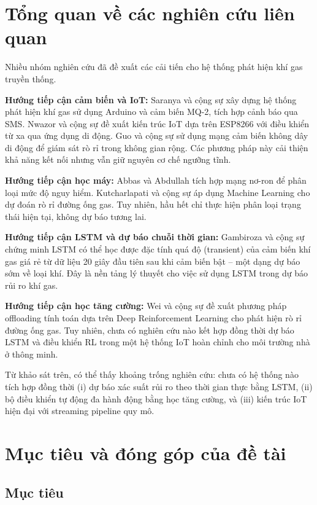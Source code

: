 \section{Tổng quan về các nghiên cứu liên quan}

Nhiều nhóm nghiên cứu đã đề xuất các cải tiến cho hệ thống phát hiện khí gas truyền thống.

\textbf{Hướng tiếp cận cảm biến và IoT:} Saranya và cộng sự \cite{saranya2023} xây dựng hệ thống phát hiện khí gas sử dụng Arduino và cảm biến MQ-2, tích hợp cảnh báo qua SMS. Nwazor và cộng sự \cite{nwazor2023} đề xuất kiến trúc IoT dựa trên ESP8266 với điều khiển từ xa qua ứng dụng di động. Guo và cộng sự \cite{guo2019} sử dụng mạng cảm biến không dây di động để giám sát rò rỉ trong không gian rộng. Các phương pháp này cải thiện khả năng kết nối nhưng vẫn giữ nguyên cơ chế ngưỡng tĩnh.

\textbf{Hướng tiếp cận học máy:} Abbas và Abdullah \cite{abbas2021} tích hợp mạng nơ-ron để phân loại mức độ nguy hiểm. Kutcharlapati và cộng sự \cite{kutcharlapati2023} áp dụng Machine Learning cho dự đoán rò rỉ đường ống gas. Tuy nhiên, hầu hết chỉ thực hiện phân loại trạng thái hiện tại, không dự báo tương lai.

\textbf{Hướng tiếp cận LSTM và dự báo chuỗi thời gian:} Gambiroza và cộng sự \cite{gambiroza2020} chứng minh LSTM có thể học được đặc tính quá độ (transient) của cảm biến khí gas giá rẻ từ dữ liệu 20 giây đầu tiên sau khi cảm biến bật – một dạng dự báo sớm về loại khí. Đây là nền tảng lý thuyết cho việc sử dụng LSTM trong dự báo rủi ro khí gas.

\textbf{Hướng tiếp cận học tăng cường:} Wei và cộng sự \cite{wei2022} đề xuất phương pháp offloading tính toán dựa trên Deep Reinforcement Learning cho phát hiện rò rỉ đường ống gas. Tuy nhiên, chưa có nghiên cứu nào kết hợp đồng thời dự báo LSTM và điều khiển RL trong một hệ thống IoT hoàn chỉnh cho môi trường nhà ở thông minh.

Từ khảo sát trên, có thể thấy khoảng trống nghiên cứu: chưa có hệ thống nào tích hợp đồng thời (i) dự báo xác suất rủi ro theo thời gian thực bằng LSTM, (ii) bộ điều khiển tự động đa hành động bằng học tăng cường, và (iii) kiến trúc IoT hiện đại với streaming pipeline quy mô.

\section{Mục tiêu và đóng góp của đề tài}

\subsection{Mục tiêu}

